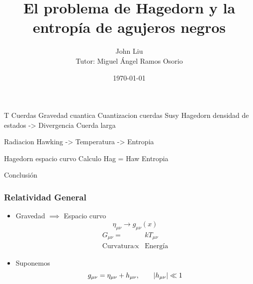 \documentclass{beamer}
\begin{document}
\title{El problema de Hagedorn y la entropía de agujeros negros} 
\author{John Liu \\
        Tutor: Miguel Ángel Ramos Osorio}
\date{\today} 
\frame{\titlepage} 

T Cuerdas
  Gravedad cuantica
  Cuantizacion cuerdas
  Susy
Hagedorn densidad de estados -> Divergencia
Cuerda larga

Radiacion Hawking -> Temperatura -> Entropia

Hagedorn espacio curvo
  Calculo 
  Hag = Haw
  Entropia

Conclusión

\begin{frame}
\frametitle{Relatividad General}
\begin{itemize}
  \item Gravedad \(\implies\) Espacio curvo
\[
  \eta_{\mu\nu} \to g_{\mu\nu}(x)
\]
\begin{align*}
  G_{\mu\nu}=&kT_{\mu\nu}\\
  \text{Curvatura}\propto& \text{Energía}
\end{align*}

\item Suponemos 
\[
  g_{\mu\nu}=\eta_{\mu\nu}+h_{\mu\nu}, \qquad \abs{h_{\mu\nu}}\ll 1
\]
\end{itemize}

\end{frame}
\end{document}
